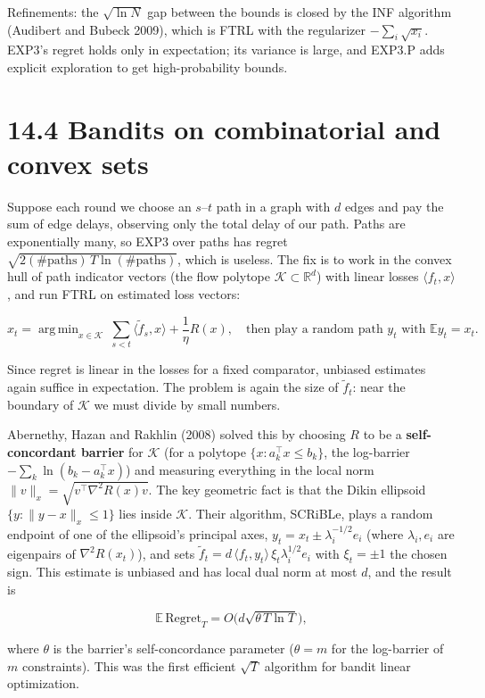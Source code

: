 \documentclass[11pt,a4paper,openany]{book}
\newcommand{\R}{\mathbb{R}}
\newcommand{\E}{\mathbb{E}}
\newcommand{\Reg}{\mathrm{Regret}}
\DeclareMathOperator*{\argmin}{arg\,min}
\newcommand{\ip}[2]{\langle #1,#2\rangle}
\newcommand{\norm}[1]{\lVert #1\rVert}
\newcommand{\cK}{\mathcal{K}}
\begin{document}
Refinements: the $\sqrt{\ln N}$ gap between the bounds is closed by the INF algorithm (Audibert and Bubeck 2009), which is FTRL with the regularizer $-\sum_i\sqrt{x_i}$. EXP3's regret holds only in expectation; its variance is large, and EXP3.P adds explicit exploration to get high-probability bounds.

\section*{14.4 Bandits on combinatorial and convex sets}\label{ch14-linear}

Suppose each round we choose an $s$–$t$ path in a graph with $d$ edges and pay the sum of edge delays, observing only the total delay of our path. Paths are exponentially many, so EXP3 over paths has regret $\sqrt{2(\#\text{paths})\,T\ln(\#\text{paths})}$, which is useless. The fix is to work in the convex hull of path indicator vectors (the flow polytope $\cK\subset\R^d$) with linear losses $\ip{f_t}{x}$, and run FTRL on estimated loss vectors:

\[x_t=\argmin_{x\in\cK}\ \sum_{s<t}\ip{\tilde f_s}{x}+\frac1\eta R(x),\quad\text{then play a random path }y_t\text{ with }\E y_t=x_t.\]

Since regret is linear in the losses for a fixed comparator, unbiased estimates again suffice in expectation. The problem is again the size of $\tilde f_t$: near the boundary of $\cK$ we must divide by small numbers.

Abernethy, Hazan and Rakhlin (2008) solved this by choosing $R$ to be a \textbf{self-concordant barrier} for $\cK$ (for a polytope $\{x:a_k^\top x\le b_k\}$, the log-barrier $-\sum_k\ln(b_k-a_k^\top x)$) and measuring everything in the local norm $\norm{v}_{x}=\sqrt{v^\top\nabla^2R(x)v}$. The key geometric fact is that the Dikin ellipsoid $\{y:\norm{y-x}_x\le1\}$ lies inside $\cK$. Their algorithm, SCRiBLe, plays a random endpoint of one of the ellipsoid's principal axes, $y_t=x_t\pm\lambda_i^{-1/2}e_i$ (where $\lambda_i,e_i$ are eigenpairs of $\nabla^2R(x_t)$), and sets $\tilde f_t=d\,\ip{f_t}{y_t}\,\xi_t\lambda_i^{1/2}e_i$ with $\xi_t=\pm1$ the chosen sign. This estimate is unbiased and has local dual norm at most $d$, and the result is

\[\E\,\Reg_T=O\big(d\sqrt{\theta\,T\ln T}\big),\]

where $\theta$ is the barrier's self-concordance parameter ($\theta=m$ for the log-barrier of $m$ constraints). This was the first efficient $\sqrt T$ algorithm for bandit linear optimization.
\end{document}
